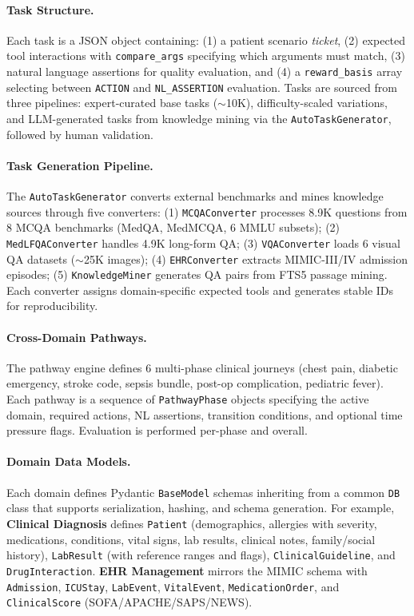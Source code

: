 \documentclass{article}
\begin{document}
\paragraph{Task Structure.}
Each task is a JSON object containing: (1) a patient scenario \emph{ticket}, (2) expected tool interactions with \texttt{compare\_args} specifying which arguments must match, (3) natural language assertions for quality evaluation, and (4) a \texttt{reward\_basis} array selecting between \texttt{ACTION} and \texttt{NL\_ASSERTION} evaluation. Tasks are sourced from three pipelines: expert-curated base tasks ($\sim$10K), difficulty-scaled variations, and LLM-generated tasks from knowledge mining via the \texttt{AutoTaskGenerator}, followed by human validation.

\paragraph{Task Generation Pipeline.}
The \texttt{AutoTaskGenerator} converts external benchmarks and mines knowledge sources through five converters: (1) \texttt{MCQAConverter} processes 8.9K questions from 8 MCQA benchmarks (MedQA, MedMCQA, 6 MMLU subsets); (2) \texttt{MedLFQAConverter} handles 4.9K long-form QA; (3) \texttt{VQAConverter} loads 6 visual QA datasets ($\sim$25K images); (4) \texttt{EHRConverter} extracts MIMIC-III/IV admission episodes; (5) \texttt{KnowledgeMiner} generates QA pairs from FTS5 passage mining. Each converter assigns domain-specific expected tools and generates stable IDs for reproducibility.

\paragraph{Cross-Domain Pathways.}
The pathway engine defines 6 multi-phase clinical journeys (chest pain, diabetic emergency, stroke code, sepsis bundle, post-op complication, pediatric fever). Each pathway is a sequence of \texttt{PathwayPhase} objects specifying the active domain, required actions, NL assertions, transition conditions, and optional time pressure flags. Evaluation is performed per-phase and overall.

\paragraph{Domain Data Models.}
Each domain defines Pydantic \texttt{BaseModel} schemas inheriting from a common \texttt{DB} class that supports serialization, hashing, and schema generation. For example, \textbf{Clinical Diagnosis} defines \texttt{Patient} (demographics, allergies with severity, medications, conditions, vital signs, lab results, clinical notes, family/social history), \texttt{LabResult} (with reference ranges and flags), \texttt{ClinicalGuideline}, and \texttt{DrugInteraction}. \textbf{EHR Management} mirrors the MIMIC schema with \texttt{Admission}, \texttt{ICUStay}, \texttt{LabEvent}, \texttt{VitalEvent}, \texttt{MedicationOrder}, and \texttt{ClinicalScore} (SOFA/APACHE/SAPS/NEWS).
\end{document}
